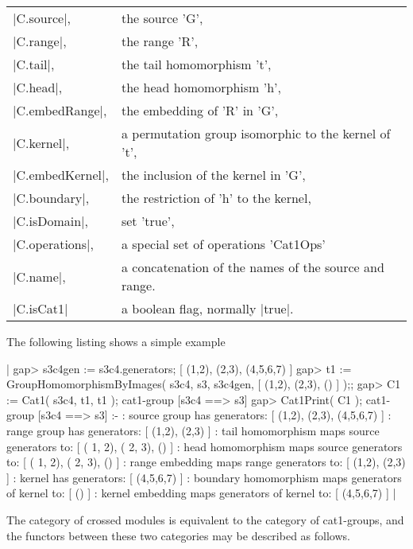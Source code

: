 \begin{tabular}{ll}
|C.source|,     & the source 'G',                                      \\
|C.range|,      & the range 'R',                                       \\
|C.tail|,       & the tail homomorphism 't',                           \\
|C.head|,       & the head homomorphism 'h',                           \\
|C.embedRange|, & the embedding of 'R' in 'G',                         \\
|C.kernel|,     & a permutation group isomorphic to the kernel of 't', \\
|C.embedKernel|,& the inclusion of the kernel in 'G',                \\
|C.boundary|,   & the restriction of 'h' to the kernel,                \\
|C.isDomain|,   & set 'true',                                          \\
|C.operations|, & a special set of operations 'Cat1Ops'                \\
|C.name|,       & a concatenation of the names of the source and range.\\
|C.isCat1| & a boolean flag, normally |true|.
\end{tabular}

The following listing shows a simple example\:

|    gap> s3c4gen := s3c4.generators;
    [ (1,2), (2,3), (4,5,6,7) ]
    gap> t1 := GroupHomomorphismByImages( s3c4, s3, s3c4gen,
          [ (1,2), (2,3), () ] );;
    gap> C1 := Cat1( s3c4, t1, t1 );
    cat1-group [s3c4 ==> s3] 
    gap> Cat1Print( C1 );
    cat1-group [s3c4 ==> s3] :- 
    : source group has generators:
      [ (1,2), (2,3), (4,5,6,7) ]
    :  range group has generators:
      [ (1,2), (2,3) ]
    : tail homomorphism maps source generators to:
      [ ( 1, 2), ( 2, 3), () ]
    : head homomorphism maps source generators to:
      [ ( 1, 2), ( 2, 3), () ]
    : range embedding maps range generators to:
      [ (1,2), (2,3) ]
    : kernel has generators:
      [ (4,5,6,7) ]
    : boundary homomorphism maps generators of kernel to:
      [ () ]
    : kernel embedding maps generators of kernel to:
      [ (4,5,6,7) ]  |


The category of crossed modules is equivalent to the category of cat1-groups,
and the functors between these two categories may be described as follows.

